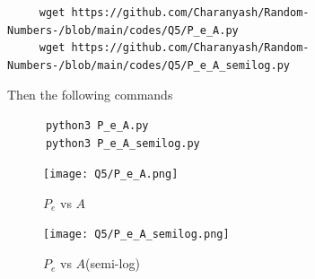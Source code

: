 \documentclass[journal,12pt,twocolumn]{IEEEtran}
\renewcommand\thesection{\arabic{section}}
\begin{document}
\begin{enumerate}[label=\thesection.\arabic*,ref=\thesection.\theenumi]
\begin{enumerate}[label=\thesection.\arabic*
,ref=\thesection.\theenumi]
\begin{lstlisting}
     wget https://github.com/Charanyash/Random-Numbers-/blob/main/codes/Q5/P_e_A.py
     wget https://github.com/Charanyash/Random-Numbers-/blob/main/codes/Q5/P_e_A_semilog.py
    \end{lstlisting}
Then the following commands
    \begin{lstlisting}
      python3 P_e_A.py
      python3 P_e_A_semilog.py
    \end{lstlisting}
\begin{figure}
  \centering
  \texttt{[image: Q5/P\_e\_A.png]}
  \caption{$P_e$ vs $A$}
  \label{fig:P_e_A}
 \end{figure}
 \begin{figure}
  \centering
  \texttt{[image: Q5/P\_e\_A\_semilog.png]}
  \caption{$P_e$ vs $A$(semi-log)}
  \label{fig:P_e_A_semilog}
 \end{figure}



\end{enumerate}
\end{enumerate}
\end{document}
